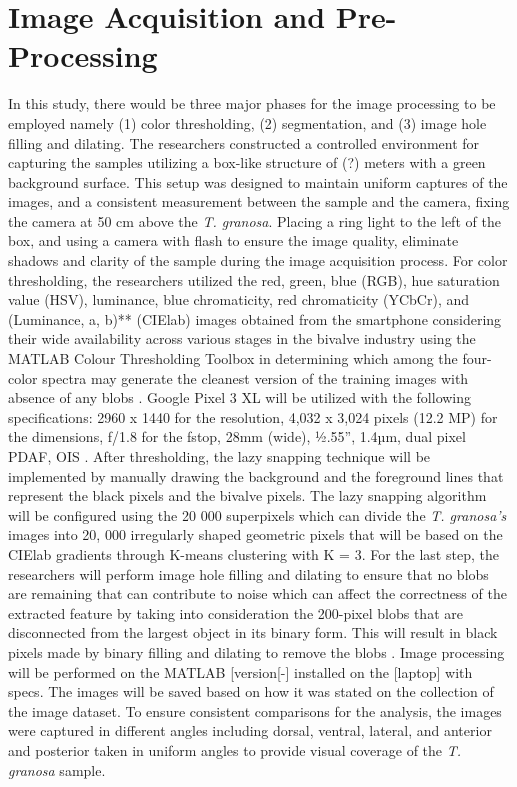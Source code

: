 \section{Image Acquisition and Pre-Processing}
\label{sec:imageprocess}
In this study, there would be three major phases for the image processing to be employed namely (1) color thresholding, (2) segmentation, and (3) image hole filling and dilating. The researchers constructed a controlled environment for capturing the samples utilizing a box-like structure of (?) meters with a green background surface. This setup was designed to maintain uniform captures of the images, and a consistent measurement between the sample and the camera, fixing the camera at 50 cm above the \textit{T. granosa}. Placing a ring light to the left of the box, and using a camera with flash to ensure the image quality, eliminate shadows and clarity of the sample during the image acquisition process. 
For color thresholding, the researchers utilized the red, green, blue (RGB), hue saturation value (HSV), luminance, blue chromaticity, red chromaticity (YCbCr), and (Luminance, a, b)** (CIElab) images obtained from the smartphone considering their wide availability across various stages in the bivalve industry using the MATLAB Colour Thresholding Toolbox in determining which among the four-color spectra may generate the cleanest version of the training images with absence of any blobs . Google Pixel 3 XL will be utilized with the following specifications: 2960 x 1440 for the resolution, 4,032 x 3,024 pixels (12.2 MP) for the dimensions, f/1.8 for the fstop, 28mm (wide), ½.55”, 1.4µm, dual pixel PDAF, OIS \cite{concepcion2023}. 
After thresholding, the lazy snapping technique will be implemented by manually drawing the background and the foreground lines that represent the black pixels and the bivalve pixels. The lazy snapping algorithm will be configured using the 20 000 superpixels which can divide the \textit{T. granosa’s} images into 20, 000 irregularly shaped geometric pixels that will be based on the CIElab gradients through K-means clustering with K = 3. For the last step, the researchers will perform image hole filling and dilating to ensure that no blobs are remaining that can contribute to noise which can affect the correctness of the extracted feature by taking into consideration the 200-pixel blobs that are disconnected from the largest object in its binary form. This will result in black pixels made by binary filling and dilating to remove the blobs \cite{concepcion2023}.
Image processing will be performed on the MATLAB [version[-] installed on the [laptop] with specs. The images will be saved based on how it was stated on the collection of the image dataset. 
To ensure consistent comparisons for the analysis, the images were captured in different angles including dorsal, ventral, lateral, and anterior and posterior taken in uniform angles to provide visual coverage of the \textit{T. granosa} sample. 

